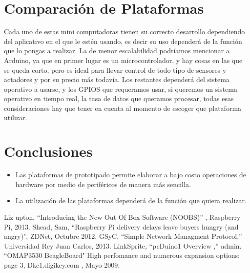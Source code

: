 \documentclass[conference]{IEEEtran}
\begin{document}
\section{Comparación de Plataformas}
Cada uno de estas mini computadoras tienen su correcto desarrollo dependiendo del aplicativo en el que le estén usando, es decir su uso dependerá de la función que lo pongas a realizar. La de menor escalabilidad podríamos mencionar a Arduino, ya que en primer lugar es un microcontrolador, y hay cosas en las que se queda corto, pero es ideal para llevar control de todo tipo de sensores y actadores y por su precio más todavía. Los restantes dependerá del sistema operativo a usarse, y los GPIOS que requeramos usar, si queremos un sistema operativo en tiempo real, la tasa de datos que queramos procesar, todas esas consideraciones hay que tener en cuenta al momento de escoger que plataforma utilizar.
\section{Conclusiones}
\begin{itemize}
	\item Las plataformas de prototipado permite elaborar a bajo costo operaciones de hardware por medio de periféricos de manera más sencilla.
	\item La utilización de las plataformas dependerá de la función que quiera realizar.
\end{itemize}

\begin{thebibliography}{00}
  Liz upton, ``Introducing the New Out Of Box Software (NOOBS)'' , Raspberry Pi, 2013.
 Shead, Sam, ``Raspberry Pi delivery delays leave buyers hungry (and angry)", ZDNet, Octubre 2012.
 GSyC, ``Simple Network Managment Protocol,''  Universidad Rey Juan Carlos, 2013.
 LinkSprite, ``pcDuino1 Overview ,''  admin.
 ``OMAP3530 BeagleBoard" High perfomance and numerous expansion options; page 3, Dkc1.digikey.com , Mayo 2009.
\end{thebibliography}
\end{document}
